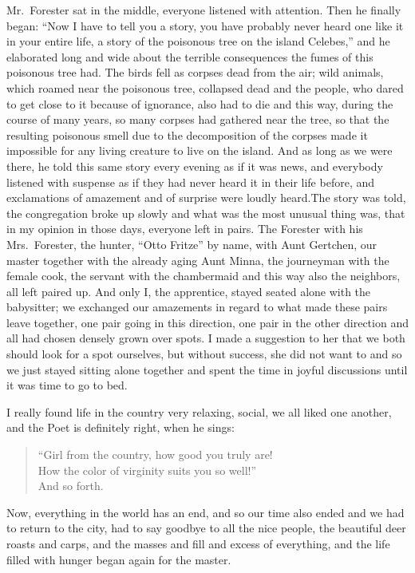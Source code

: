 Mr.~Forester sat in the middle, everyone listened with attention. Then he finally began: ``Now I have to tell you a story, you have probably never heard one like it in your entire life, a story of the poisonous tree on the island Celebes,'' and he elaborated long and wide about the terrible consequences the fumes of this poisonous tree had. The birds fell as corpses dead from the air; wild animals, which roamed near the poisonous tree, collapsed dead and the people, who dared to get close to it because of ignorance, also had to die and this way, during the course of many years, so many corpses had gathered near the tree, so that the resulting poisonous smell due to the decomposition of the corpses made it impossible for any living creature to live on the island. And as long as we were there, he told this same story every evening as if it was news, and everybody listened with suspense as if they had never heard it in their life before, and exclamations of amazement and of surprise were loudly heard.The story was told, the congregation broke up slowly and what was the most unusual thing was, that in my opinion in those days, everyone left in pairs. The Forester with his Mrs.~Forester, the hunter, ``Otto Fritze'' by name, with Aunt Gertchen, our master together with the already aging Aunt Minna, the journeyman with the female cook, the servant with the chambermaid and this way also the neighbors, all left paired up. And only I, the apprentice, stayed seated alone with the babysitter; we exchanged our amazements in regard to what made these pairs leave together, one pair going in this direction, one pair in the other direction and all had chosen densely grown over spots. I made a suggestion to her that we both should look for a spot ourselves, but without success, she did not want to and so we just stayed sitting alone together and spent the time in joyful discussions until it was time to go to bed.

I really found life in the country very relaxing, social, we all liked one another, and the Poet is definitely right, when he sings:

\begin{quote}
``Girl from the country, how good you truly are!\\
How the color of virginity suits you so well!''\\
And so forth.
\end{quote}

Now, everything in the world has an end, and so our time also ended and we had to return to the city, had to say goodbye to all the nice people, the beautiful deer roasts and carps, and the masses and fill and excess of everything, and the life filled with hunger began again for the master.

